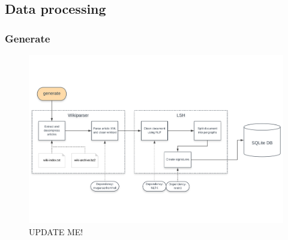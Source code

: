 \subsection{Data processing}
\subsubsection{Generate}
\label{sec:gen}


\begin{figure}[ht]
	\centering
    \includegraphics[width = \linewidth]{docs/report/input/generate.pdf}
    \captionsetup{width = \linewidth}
    \caption{UPDATE ME!}
    \label{fig:generate}
\end{figure}

